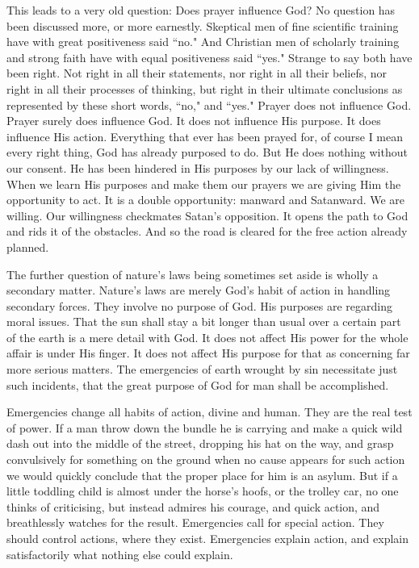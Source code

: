 This leads to a very old question: Does prayer influence God? No question
has been discussed more, or more earnestly. Skeptical men of fine
scientific training have with great positiveness said ``no." And Christian
men of scholarly training and strong faith have with equal positiveness
said ``yes." Strange to say both have been right. Not right in all their
statements, nor right in all their beliefs, nor right in all their
processes of thinking, but right in their ultimate conclusions as
represented by these short words, ``no," and ``yes." Prayer does not
influence God. Prayer surely does influence God. It does not influence His
purpose. It does influence His action. Everything that ever has been
prayed for, of course I mean every right thing, God has already purposed
to do. But He does nothing without our consent. He has been hindered in
His purposes by our lack of willingness. When we learn His purposes and
make them our prayers we are giving Him the opportunity to act. It is a
double opportunity: manward and Satanward. We are willing. Our willingness
checkmates Satan's opposition. It opens the path to God and rids it of the
obstacles. And so the road is cleared for the free action already planned.

The further question of nature's laws being sometimes set aside is wholly
a secondary matter. Nature's laws are merely God's habit of action in
handling secondary forces. They involve no purpose of God. His purposes
are regarding moral issues. That the sun shall stay a bit longer than
usual over a certain part of the earth is a mere detail with God. It does
not affect His power for the whole affair is under His finger. It does not
affect His purpose for that as concerning far more serious matters. The
emergencies of earth wrought by sin necessitate just such incidents, that
the great purpose of God for man shall be accomplished.

Emergencies change all habits of action, divine and human. They are the
real test of power. If a man throw down the bundle he is carrying and make
a quick wild dash out into the middle of the street, dropping his hat on
the way, and grasp convulsively for something on the ground when no cause
appears for such action we would quickly conclude that the proper place
for him is an asylum. But if a little toddling child is almost under the
horse's hoofs, or the trolley car, no one thinks of criticising, but
instead admires his courage, and quick action, and breathlessly watches
for the result. Emergencies call for special action. They should control
actions, where they exist. Emergencies explain action, and explain
satisfactorily what nothing else could explain.

